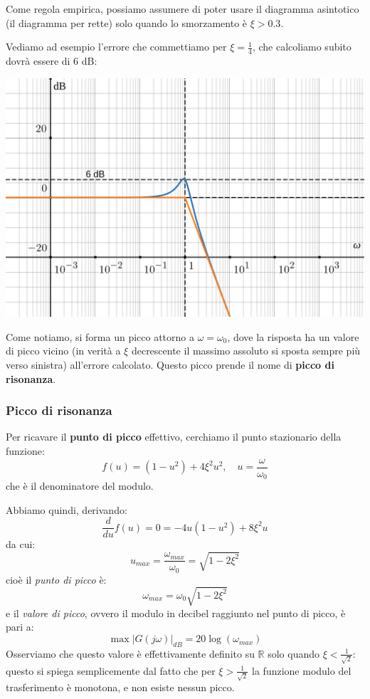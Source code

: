 \documentclass[a4paper,11pt]{article}
\begin{document}
Come regola empirica, possiamo assumere di poter usare il diagramma asintotico (il diagramma per rette) solo quando lo smorzamento è $\xi > 0.3$.

\par\bigskip

\noindent
\begin{minipage}{\textwidth}
Vediamo ad esempio l'errore che commettiamo per $\xi = \frac{1}{4}$, che calcoliamo subito dovrà essere di 6 dB:

\begin{center}
	\includegraphics[scale=0.3]{../figures/order2_bode/reso_025_mod.png}
\end{center}
\end{minipage}

\par\bigskip

Come notiamo, si forma un picco attorno a $\omega = \omega_0$, dove la risposta ha un valore di picco vicino (in verità a $\xi$ decrescente il massimo assoluto si sposta sempre più verso sinistra) all'errore calcolato.
Questo picco prende il nome di \textbf{picco di risonanza}.

\subsubsection{Picco di risonanza}
Per ricavare il \textbf{punto di picco} effettivo, cerchiamo il punto stazionario della funzione:
$$
f(u) = (1 - u^2) + 4 \xi^2 u^2, \quad u= \frac{\omega}{\omega_0}
$$
che è il denominatore del modulo.

Abbiamo quindi, derivando:
$$
\frac{d}{du} f(u) = 0 = -4u(1 - u^2) + 8 \xi^2 u
$$
da cui:
$$
u_{max} = \frac{\omega_{max}}{\omega_0} = \sqrt{1 - 2 \xi^2}
$$
cioè il \textit{punto di picco} è:
$$
\omega_{max} = \omega_0 \sqrt{1 - 2 \xi^2} 
$$
e il \textit{valore di picco}, ovvero il modulo in decibel raggiunto nel punto di picco, è pari a:
$$
\max |G(j \omega)|_{dB} = 20 \log \left( \omega_{max} \right)
$$
Osserviamo che questo valore è effettivamente definito su $\mathbb{R}$ solo quando $\xi < \frac{1}{\sqrt{2}}$: questo si spiega semplicemente dal fatto che per $\xi > \frac{1}{\sqrt{2}}$ la funzione modulo del trasferimento è monotona, e non esiste nessun picco.
\end{document}

